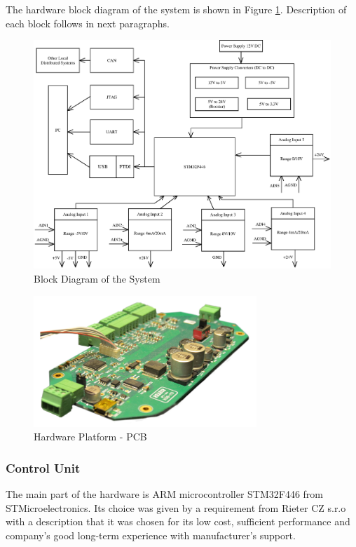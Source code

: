 \documentclass[twoside]{ctuthesis}
\theoremstyle{plain}
\theoremstyle{definition}
\theoremstyle{note}
\begin{document}
The hardware block diagram of the system is shown in Figure \ref{fig:blockDiagram_HW}. Description of each block follows in next paragraphs.
\begin{figure}[h]
	\centering
	\includegraphics[width=1.0\textwidth]{blockSchematic5.eps}
	\caption{Block Diagram of the System}
	\label{fig:blockDiagram_HW}
\end{figure}

\begin{figure}[h]
	\centering
	\includegraphics[width=0.75\textwidth]{cvBox.jpg}
	\caption{Hardware Platform - PCB}
	\label{fig:cvBox_dps}
\end{figure}

\subsubsection{Control Unit}
\label{sec:microController}
	The main part of the hardware is ARM microcontroller STM32F446 from STMicroelectronics. Its choice was given by a requirement from Rieter CZ s.r.o with a description that it was chosen for its low cost, sufficient performance and company's good long-term experience with manufacturer's support. 
	
\end{document}
